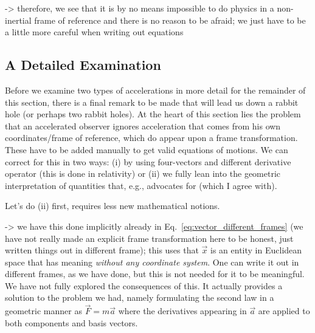 \documentclass[../class_mech_main.tex]{subfiles}
\begin{document}
-> therefore, we see that it is by no means impossible to do physics in a non-inertial frame of reference and there is no reason to be afraid; we just have to be a little more careful when writing out equations







		\subsection{A Detailed Examination}

Before we examine two types of accelerations in more detail for the remainder of this section, there is a final remark to be made that will lead us down a rabbit hole (or perhaps two rabbit holes). At the heart of this section lies the problem that an accelerated observer ignores acceleration that comes from his own coordinates/frame of reference, which do appear upon a frame transformation. These have to be added manually to get valid equations of motions. We can correct for this in two ways: (i) by using four-vectors and different derivative operator (this is done in relativity) or (ii) we fully lean into the geometric interpretation of quantities that, e.g., \cite{Thorne_2017} advocates for (which I agree with).


Let's do (ii) first, requires less new mathematical notions. 

-> we have this done implicitly already in Eq.~\eqref{eq:vector_different_frames} (we have not really made an explicit frame transformation here to be honest, just written things out in different frame); this uses that $\vec{x}$ is an entity in Euclidean space that has meaning \emph{without any coordinate system}. One can write it out in different frames, as we have done, but this is not needed for it to be meaningful. We have not fully explored the consequences of this. It actually provides a solution to the problem we had, namely formulating the second law in a geometric manner as $\vec{F} = m \vec{a}$ where the derivatives appearing in $\vec{a}$ are applied to both components and basis vectors.
\end{document}
